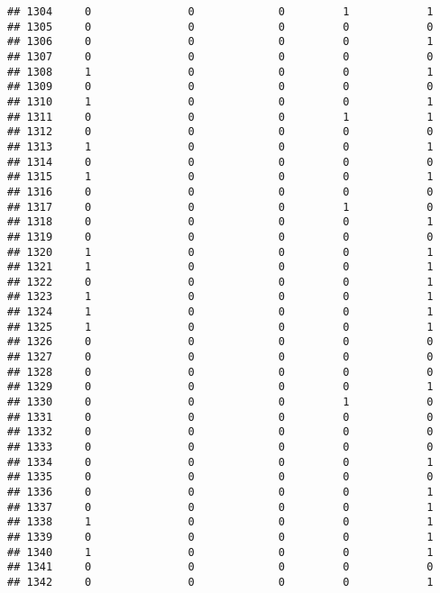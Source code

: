 \documentclass[]{article}
\begin{document}
\begin{verbatim}
## 1304     0               0             0         1            1
## 1305     0               0             0         0            0
## 1306     0               0             0         0            1
## 1307     0               0             0         0            0
## 1308     1               0             0         0            1
## 1309     0               0             0         0            0
## 1310     1               0             0         0            1
## 1311     0               0             0         1            1
## 1312     0               0             0         0            0
## 1313     1               0             0         0            1
## 1314     0               0             0         0            0
## 1315     1               0             0         0            1
## 1316     0               0             0         0            0
## 1317     0               0             0         1            0
## 1318     0               0             0         0            1
## 1319     0               0             0         0            0
## 1320     1               0             0         0            1
## 1321     1               0             0         0            1
## 1322     0               0             0         0            1
## 1323     1               0             0         0            1
## 1324     1               0             0         0            1
## 1325     1               0             0         0            1
## 1326     0               0             0         0            0
## 1327     0               0             0         0            0
## 1328     0               0             0         0            0
## 1329     0               0             0         0            1
## 1330     0               0             0         1            0
## 1331     0               0             0         0            0
## 1332     0               0             0         0            0
## 1333     0               0             0         0            0
## 1334     0               0             0         0            1
## 1335     0               0             0         0            0
## 1336     0               0             0         0            1
## 1337     0               0             0         0            1
## 1338     1               0             0         0            1
## 1339     0               0             0         0            1
## 1340     1               0             0         0            1
## 1341     0               0             0         0            0
## 1342     0               0             0         0            1

\end{verbatim}
\end{document}
